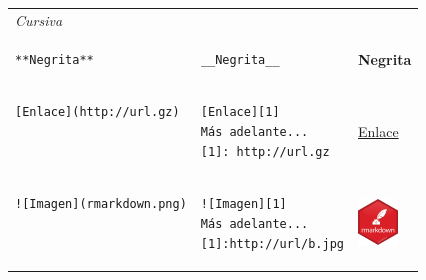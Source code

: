 \documentclass[]{book}
\theoremstyle{definition}
\theoremstyle{definition}
\theoremstyle{definition}
\theoremstyle{remark}
\begin{document}
\begin{longtable}[]{@{}lll@{}}
\begin{minipage}[t]{0.32\columnwidth}
\emph{Cursiva}\strut
\end{minipage}\tabularnewline
\begin{minipage}[t]{0.32\columnwidth}\raggedright\strut
\begin{verbatim}
**Negrita**
\end{verbatim}
\strut
\end{minipage} & \begin{minipage}[t]{0.32\columnwidth}\raggedright\strut
\begin{verbatim}
__Negrita__
\end{verbatim}
\strut
\end{minipage} & \begin{minipage}[t]{0.32\columnwidth}\raggedright\strut
\textbf{Negrita}\strut
\end{minipage}\tabularnewline
\begin{minipage}[t]{0.32\columnwidth}\raggedright\strut
\begin{verbatim}
[Enlace](http://url.gz)
 
 
\end{verbatim}
\strut
\end{minipage} & \begin{minipage}[t]{0.32\columnwidth}\raggedright\strut
\begin{verbatim}
[Enlace][1]
Más adelante...
[1]: http://url.gz
\end{verbatim}
\strut
\end{minipage} & \begin{minipage}[t]{0.32\columnwidth}\raggedright\strut
\href{http://rmark\%20down.rstudio.com}{Enlace}\strut
\end{minipage}\tabularnewline
\begin{minipage}[t]{0.32\columnwidth}\raggedright\strut
\begin{verbatim}
![Imagen](rmarkdown.png)
 
 
\end{verbatim}
\strut
\end{minipage} & \begin{minipage}[t]{0.32\columnwidth}\raggedright\strut
\begin{verbatim}
![Imagen][1]
Más adelante...
[1]:http://url/b.jpg
\end{verbatim}
\strut
\end{minipage} & \begin{minipage}[t]{0.32\columnwidth}\raggedright\strut
\includegraphics{images/rmd.png}\strut

\end{minipage}
\end{longtable}
\end{document}
